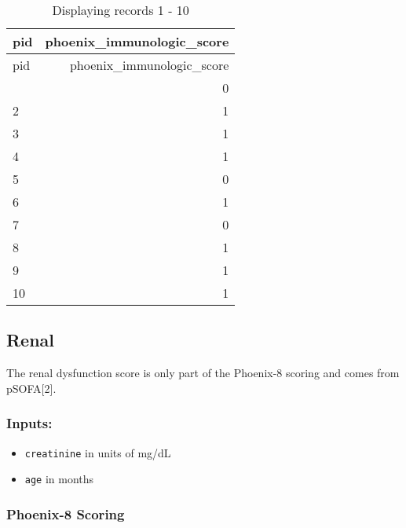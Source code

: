 \documentclass[
  letterpaper,
  DIV=11,
  numbers=noendperiod]{scrartcl}
\begin{document}
\begin{longtable}[]{@{}lr@{}}
\caption{Displaying records 1 - 10}\tabularnewline
\toprule\noalign{}
pid & phoenix\_immunologic\_score \\
\midrule\noalign{}
\endfirsthead
\toprule\noalign{}
pid & phoenix\_immunologic\_score \\
\midrule\noalign{}
\endhead
\bottomrule\noalign{}
\endlastfoot
1 & 0 \\
2 & 1 \\
3 & 1 \\
4 & 1 \\
5 & 0 \\
6 & 1 \\
7 & 0 \\
8 & 1 \\
9 & 1 \\
10 & 1 \\
\end{longtable}

\subsection{Renal}\label{renal}

The renal dysfunction score is only part of the Phoenix-8 scoring and
comes from pSOFA{[}2{]}.

\subsubsection{Inputs:}\label{inputs-6}

\begin{itemize}
\item
  \texttt{creatinine} in units of mg/dL
\item
  \texttt{age} in months
\end{itemize}

\subsubsection{Phoenix-8 Scoring}\label{phoenix-8-scoring-2}
\end{document}

